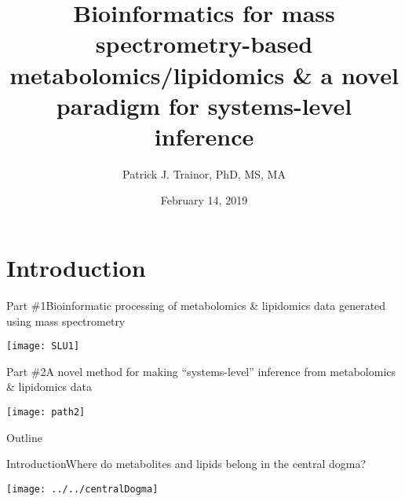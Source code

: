 \documentclass[xcolor=dvipsnames]{beamer}
\begin{document}
	
\title[Bioinformatics for MS and Systems Inference]{{\bf Bioinformatics for mass spectrometry-based metabolomics/lipidomics \& a novel paradigm for systems-level inference}}
\author[P.J. Trainor]{Patrick J. Trainor, PhD, MS, MA}
\date[February 2019]{February 14, 2019}

\begin{frame}
	\titlepage
\end{frame}

\section{Introduction}

\begin{frame}{Part \#1}{Bioinformatic processing of metabolomics \& lipidomics data generated using mass spectrometry}
\vspace{-15pt}
\begin{center}
	\texttt{[image: SLU1]}
\end{center}
\end{frame}

\begin{frame}{Part \#2}{A novel method for making ``systems-level'' inference from metabolomics \& lipidomics data}
\vspace{-15pt}
\begin{center}
\texttt{[image: path2]}
\end{center}
\end{frame}

\begin{frame}{Outline}
\vspace{-10.5pt}
\tableofcontents[currentsection,subsectionstyle=hide]
\addtocounter{framenumber}{-1}
\end{frame}

\begin{frame}{Introduction}{Where do metabolites and lipids belong in the central dogma?}
\vspace{-7 pt}
\begin{center}
		\texttt{[image: ../../centralDogma]}
	\end{center}
\end{frame}
\end{document}
